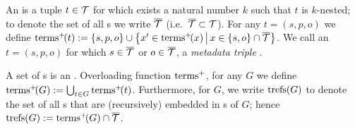 An \emph{{\RDFplusTriple}} is a tuple $t \in \mathcal{T}$ for which exists a natural number $k$ such that $t$ is $k$-nested; to denote the set of all {\RDFplusTriple}s we write $\overline{\mathcal{T}}$ (i.e.~$\overline{\mathcal{T}} \subset \mathcal{T}$).
For any {\RDFplusTriple} $t=(s,p,o)$ we define
	$\mathrm{terms}^+\!(t) := \lbrace s,p,o \rbrace \cup \big\lbrace x' \in \mathrm{terms}^+\!(x) \,\big|\, x \in \lbrace s,o \rbrace \cap \overline{\mathcal{T}} \big\rbrace$.
We call an {\RDFplusTriple}
	$t=(s,p,o)$ for which $s \in \overline{\mathcal{T}}$ or $o \in \overline{\mathcal{T}}$,
a \emph{metadata triple}%
	.

A set of {\RDFplusTriple}s is an \emph{\RDFplusGraph}. Overloading function $\mathrm{terms}^+$, for any {\RDFplusGraph} $G$ we define $\mathrm{terms}^+\!(G) := \bigcup_{t \in G} \mathrm{terms}^+\!(t)$. Furthermore, for {\RDFplusGraph} $G$, we write $\mathrm{trefs}(G)$ to denote the set of all {\RDFplusTriple}s that are (recursively) embedded in {\RDFplusTriple}s of $G$; hence $\mathrm{trefs}(G) := \mathrm{terms}^+\!(G) \cap \overline{\mathcal{T}}$.





